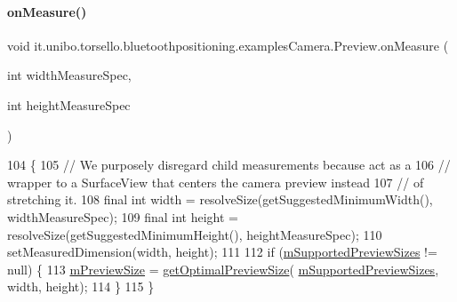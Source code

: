 \paragraph{\texorpdfstring{on\+Measure()}{onMeasure()}}
{\footnotesize\ttfamily void it.\+unibo.\+torsello.\+bluetoothpositioning.\+examples\+Camera.\+Preview.\+on\+Measure (\begin{DoxyParamCaption}\item[{int}]{width\+Measure\+Spec,  }\item[{int}]{height\+Measure\+Spec }\end{DoxyParamCaption})\hspace{0.3cm}{\ttfamily [protected]}}


\begin{DoxyCode}
104                                                                           \{
105         \textcolor{comment}{// We purposely disregard child measurements because act as a}
106         \textcolor{comment}{// wrapper to a SurfaceView that centers the camera preview instead}
107         \textcolor{comment}{// of stretching it.}
108         \textcolor{keyword}{final} \textcolor{keywordtype}{int} width = resolveSize(getSuggestedMinimumWidth(), widthMeasureSpec);
109         \textcolor{keyword}{final} \textcolor{keywordtype}{int} height = resolveSize(getSuggestedMinimumHeight(), heightMeasureSpec);
110         setMeasuredDimension(width, height);
111 
112         \textcolor{keywordflow}{if} (\hyperlink{classit_1_1unibo_1_1torsello_1_1bluetoothpositioning_1_1examplesCamera_1_1Preview_a791c85132a70dbfdf70587f12753e306_a791c85132a70dbfdf70587f12753e306}{mSupportedPreviewSizes} != null) \{
113             \hyperlink{classit_1_1unibo_1_1torsello_1_1bluetoothpositioning_1_1examplesCamera_1_1Preview_a88377f3f6e83780ee72b8cd7af58f139_a88377f3f6e83780ee72b8cd7af58f139}{mPreviewSize} = \hyperlink{classit_1_1unibo_1_1torsello_1_1bluetoothpositioning_1_1examplesCamera_1_1Preview_a46718c866d8f8bc77c5efb98f38e8ad8_a46718c866d8f8bc77c5efb98f38e8ad8}{getOptimalPreviewSize}(
      \hyperlink{classit_1_1unibo_1_1torsello_1_1bluetoothpositioning_1_1examplesCamera_1_1Preview_a791c85132a70dbfdf70587f12753e306_a791c85132a70dbfdf70587f12753e306}{mSupportedPreviewSizes}, width, height);
114         \}
115     \}
\end{DoxyCode}
\hypertarget{classit_1_1unibo_1_1torsello_1_1bluetoothpositioning_1_1examplesCamera_1_1Preview_af63fabacd267ab2763cc3183464dbf47_af63fabacd267ab2763cc3183464dbf47}{}\label{classit_1_1unibo_1_1torsello_1_1bluetoothpositioning_1_1examplesCamera_1_1Preview_af63fabacd267ab2763cc3183464dbf47_af63fabacd267ab2763cc3183464dbf47} 
